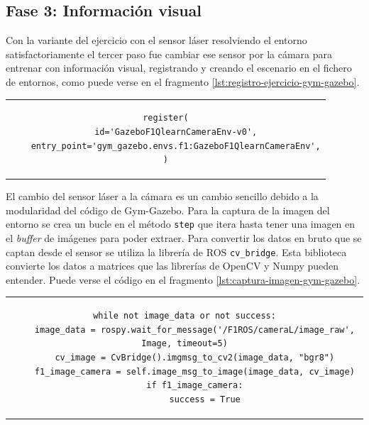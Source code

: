 \subsection{Fase 3: Información visual}

Con la variante del ejercicio con el sensor láser resolviendo el entorno satisfactoriamente el tercer paso fue cambiar ese sensor por la cámara para entrenar con información visual, registrando y creando el escenario en el fichero de entornos, como puede verse en el fragmento \ref{lst:registro-ejercicio-gym-gazebo}.\\

\vspace{5mm}

\begin{tabular}{c}
\begin{lstlisting}[basicstyle=\ttfamily\footnotesize, caption={Registro de un nuevo entorno en Gym-Gazebo.}, captionpos=b, numbers=none, label={lst:registro-ejercicio-gym-gazebo}, style=Python]
register(
    id='GazeboF1QlearnCameraEnv-v0',
    entry_point='gym_gazebo.envs.f1:GazeboF1QlearnCameraEnv',
)
\end{lstlisting}
\end{tabular}

\vspace{5mm}

El cambio del sensor láser a la cámara es un cambio sencillo debido a la modularidad del código de Gym-Gazebo. Para la captura de la imagen del entorno se crea un bucle en el método \texttt{step} que itera hasta tener una imagen en el \textit{buffer} de imágenes para poder extraer. Para convertir los datos en bruto que se captan desde el sensor se utiliza la librería de ROS \texttt{cv\_bridge}. Esta biblioteca convierte los datos a matrices que las librerías de OpenCV y Numpy pueden entender. Puede verse el código en el fragmento \ref{lst:captura-imagen-gym-gazebo}.\\

\vspace{5mm}

\begin{tabular}{c}
\begin{lstlisting}[basicstyle=\ttfamily\scriptsize, caption={Extracción de la imagen tomada desde la cámara.}, captionpos=b, numbers=none, label={lst:captura-imagen-gym-gazebo}, style=Python] 
while not image_data or not success:
    image_data = rospy.wait_for_message('/F1ROS/cameraL/image_raw', Image, timeout=5)
    cv_image = CvBridge().imgmsg_to_cv2(image_data, "bgr8")
    f1_image_camera = self.image_msg_to_image(image_data, cv_image)
    if f1_image_camera:
        success = True
\end{lstlisting}
\end{tabular}

